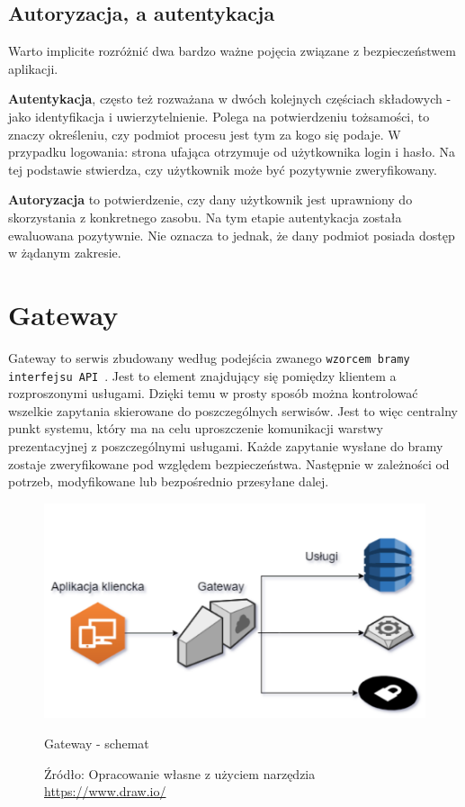 \subsection{Autoryzacja, a autentykacja}

Warto implicite rozróżnić dwa bardzo ważne pojęcia związane z bezpieczeństwem aplikacji.

\textbf{Autentykacja}, często też rozważana w dwóch kolejnych częściach składowych - jako identyfikacja i uwierzytelnienie. Polega na potwierdzeniu tożsamości, to znaczy określeniu, czy podmiot procesu jest tym za kogo się podaje. W przypadku logowania: strona ufająca otrzymuje od użytkownika login i hasło. Na tej podstawie stwierdza, czy użytkownik może być pozytywnie zweryfikowany.

\textbf{Autoryzacja} to potwierdzenie, czy dany użytkownik jest uprawniony do skorzystania z konkretnego zasobu. Na tym etapie autentykacja została ewaluowana pozytywnie. Nie oznacza to jednak, że dany podmiot posiada dostęp w żądanym zakresie. 

\section{Gateway}
Gateway to serwis zbudowany według podejścia zwanego \texttt{wzorcem bramy interfejsu API}~\cite{richardson2018api}. Jest to element znajdujący się pomiędzy klientem a rozproszonymi usługami. Dzięki temu w prosty sposób można kontrolować wszelkie zapytania skierowane do poszczególnych serwisów.
Jest to więc centralny punkt systemu, który ma na celu uproszczenie komunikacji warstwy prezentacyjnej z poszczególnymi usługami. Każde zapytanie wysłane do bramy zostaje zweryfikowane pod względem bezpieczeństwa. Następnie w zależności od potrzeb, modyfikowane lub bezpośrednio przesyłane dalej.
\begin{figure}[H]
	\centering
	\includegraphics[width=\linewidth]{gateway.pdf}
	\caption{\centering Gateway - schemat}
	\caption*{\centering Źródło: {Opracowanie własne z użyciem narzędzia \url{https://www.draw.io/}}}
\end{figure}

